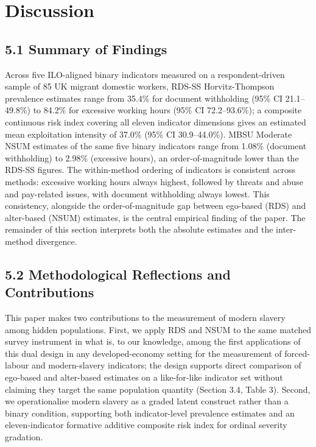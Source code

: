 \documentclass[
  12pt,
  letterpaper,
  DIV=11,
  numbers=noendperiod]{scrartcl}
\begin{document}
\section{Discussion}\label{discussion}

\subsection{5.1 Summary of Findings}\label{summary-of-findings}

Across five ILO-aligned binary indicators measured on a
respondent-driven sample of 85 UK migrant domestic workers, RDS-SS
Horvitz-Thompson prevalence estimates range from 35.4\% for document
withholding (95\% CI 21.1--49.8\%) to 84.2\% for excessive working hours
(95\% CI 72.2--93.6\%); a composite continuous risk index covering all
eleven indicator dimensions gives an estimated mean exploitation
intensity of 37.0\% (95\% CI 30.9--44.0\%). MBSU Moderate NSUM estimates
of the same five binary indicators range from 1.08\% (document
withholding) to 2.98\% (excessive hours), an order-of-magnitude lower
than the RDS-SS figures. The within-method ordering of indicators is
consistent across methods: excessive working hours always highest,
followed by threats and abuse and pay-related issues, with document
withholding always lowest. This consistency, alongside the
order-of-magnitude gap between ego-based (RDS) and alter-based (NSUM)
estimates, is the central empirical finding of the paper. The remainder
of this section interprets both the absolute estimates and the
inter-method divergence.

\subsection{5.2 Methodological Reflections and
Contributions}\label{methodological-reflections-and-contributions}

This paper makes two contributions to the measurement of modern slavery
among hidden populations. First, we apply RDS and NSUM to the same
matched survey instrument in what is, to our knowledge, among the first
applications of this dual design in any developed-economy setting for
the measurement of forced-labour and modern-slavery indicators; the
design supports direct comparison of ego-based and alter-based estimates
on a like-for-like indicator set without claiming they target the same
population quantity (Section 3.4, Table 3). Second, we operationalise
modern slavery as a graded latent construct rather than a binary
condition, supporting both indicator-level prevalence estimates and an
eleven-indicator formative additive composite risk index for ordinal
severity gradation.
\end{document}

